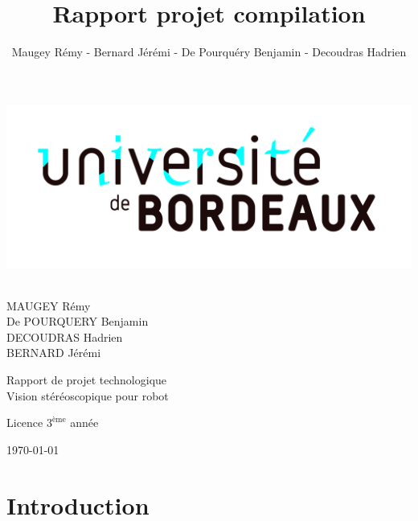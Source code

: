 \documentclass[12pt,a4paper]{report}
\author{Maugey Rémy - Bernard Jérémi - De Pourquéry Benjamin - Decoudras Hadrien}
\title{Rapport projet compilation}
\begin{document}
\begin{titlepage}
  \begin{sffamily}
  \begin{center}

    \includegraphics[scale=0.05]{logo.jpg}~\\[1.5cm]
    \begin{minipage}{0.43\textwidth}
      \begin{flushleft} \large
		MAUGEY Rémy\\
		De POURQUERY Benjamin\\
		DECOUDRAS Hadrien\\
		BERNARD Jérémi\\		
		
      \end{flushleft}
    \end{minipage}

	\vspace*{\fill}
	\Huge{Rapport de projet technologique}\\
	\Large{Vision stéréoscopique pour robot}\\
	\vspace*{\fill}

	\vfill
    \begin{small}
 	Licence $3^{\text{ème}}$ année\\
 	\end{small}
    {\large \today}\\

  \end{center}
  \end{sffamily}
\end{titlepage}

\chapter{Introduction}
\end{document}
